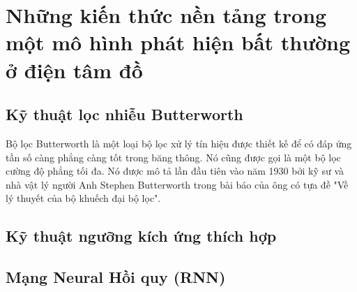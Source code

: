 \chapter{Những kiến thức nền tảng trong một mô hình phát hiện bất thường ở điện tâm đồ}
\newpage

\section{Kỹ thuật lọc nhiễu Butterworth}
Bộ lọc Butterworth là một loại bộ lọc xử lý tín hiệu được thiết kế để có đáp ứng tần số càng phẳng càng tốt trong băng thông. Nó cũng được gọi là một bộ lọc cường độ phẳng tối đa. Nó được mô tả lần đầu tiên vào năm 1930 bởi kỹ sư và nhà vật lý người Anh Stephen Butterworth trong bài báo của ông có tựa đề "Về lý thuyết của bộ khuếch đại bộ lọc".
\section{Kỹ thuật ngưỡng kích ứng thích hợp}

\section{Mạng Neural Hồi quy (RNN)}
